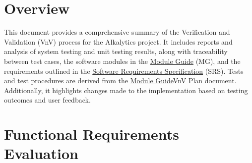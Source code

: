 \documentclass[12pt, titlepage]{article}
\begin{document}
\newpage

\tableofcontents

\listoftables %

\listoffigures %

\newpage


\section{Overview}
This document provides a comprehensive summary of the Verification and
Validation (VnV) process for the Alkalytics project. It includes reports and
analysis of system testing and unit testing results, along with traceability
between test cases, the software modules in the
\href{https://github.com/SumanyaG/Alkalytics/blob/main/docs/Design/MG.pdf}{Module
Guide} (MG), and the requirements outlined in the
\href{https://github.com/SumanyaG/Alkalytics/blob/main/docs/SRS/SRS.pdf}{Software
Requirements Specification} (SRS). Tests and test procedures are derived from the \href{https://github.com/SumanyaG/Alkalytics/blob/main/docs/VnVPlan/VnVPlan.pdf}{Module
Guide}{VnV Plan} document. Additionally, it highlights changes made to the
implementation based on testing outcomes and user feedback.

\section{Functional Requirements Evaluation}
\end{document}
